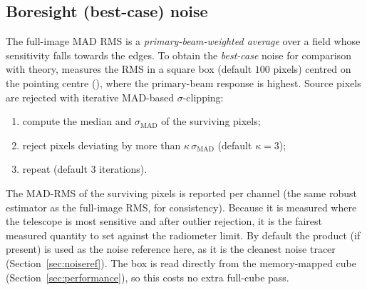 \documentclass[11pt,a4paper]{article}
\begin{document}
\subsection{Boresight (best-case) noise}\label{sec:boresight}
The full-image MAD RMS is a \emph{primary-beam-weighted average} over a field
whose sensitivity falls towards the edges. To obtain the \emph{best-case} noise
for comparison with theory,  measures the RMS in a square
box (default $100$ pixels) centred on the pointing centre (), where
the primary-beam response is highest. Source pixels are rejected with iterative
MAD-based $\sigma$-clipping:
\begin{enumerate}[noitemsep,topsep=2pt]
  \item compute the median and $\sigma_{\mathrm{MAD}}$ of the surviving pixels;
  \item reject pixels deviating by more than $\kappa\,\sigma_{\mathrm{MAD}}$
        (default $\kappa = 3$);
  \item repeat (default $3$ iterations).
\end{enumerate}
The MAD-RMS of the surviving pixels is reported per channel (the same robust
estimator as the full-image RMS, for consistency). Because it is measured where
the telescope is most sensitive and after outlier rejection, it is the fairest
measured quantity to set against the radiometer limit. By default the
 product (if present) is used as the noise reference here, as it
is the cleanest noise tracer (Section~\ref{sec:noiseref}). The box is read
directly from the memory-mapped cube (Section~\ref{sec:performance}), so this
costs no extra full-cube pass.
\end{document}
